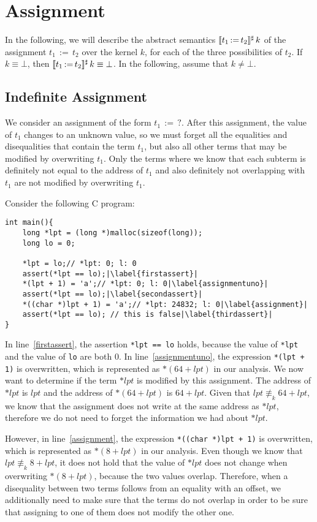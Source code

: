\section{Assignment}

In the following, we will describe the abstract semantics $\llbracket t_1\,{:=}\,t_2\rrbracket^\sharp\,k$ of the assignment $t_1\,{:=}\,t_2$ over the kernel $k$, for each of the three possibilities of $t_2$.
If $k \equiv \bot$, then $\llbracket t_1\,{:=}\,t_2\rrbracket^\sharp\,k \equiv \bot$.
In the following, assume that $k \neq \bot$.

\subsection{Indefinite Assignment}

We consider an assignment of the form $t_1\,{:=}\,?$.
After this assignment, the value of $t_1$ changes to an unknown value,
so we must forget all the equalities and disequalities that contain the term $t_1$,
but also all other terms that may be modified by overwriting $t_1$.
Only the terms where we know that each subterm is definitely not equal to the address of $t_1$ and also definitely not overlapping with $t_1$ are not modified by overwriting $t_1$.

\begin{example}
	Consider the following C program:
\begin{verbatim}
int main(){
	long *lpt = (long *)malloc(sizeof(long));
	long lo = 0;

	*lpt = lo;// *lpt: 0; l: 0
	assert(*lpt == lo);|\label{firstassert}|
	*(lpt + 1) = 'a';// *lpt: 0; l: 0|\label{assignmentuno}|
	assert(*lpt == lo);|\label{secondassert}|
	*((char *)lpt + 1) = 'a';// *lpt: 24832; l: 0|\label{assignment}|
	assert(*lpt == lo); // this is false|\label{thirdassert}|
}
\end{verbatim}
In line~\ref{firstassert}, the assertion \texttt{*lpt == lo} holds, because the value of \texttt{*lpt} and the value of \texttt{lo} are both 0.
In line~\ref{assignmentuno}, the expression \texttt{*(lpt + 1)} is overwritten, which is represented as $*(64 + lpt)$ in our analysis.
We now want to determine if the term $*lpt$ is modified by this assignment.
The address of $*lpt$ is $lpt$ and the address of $*(64 + lpt)$ is $64 + lpt$.
Given that $lpt \nequiv_{k} 64 + lpt$, we know that the assignment does not write at the same address as $*lpt$, therefore we do not need to forget the information we had about $*lpt$.

However, in line~\ref{assignment}, the expression \texttt{*((char *)lpt + 1)} is overwritten, which is represented as $*(8 + lpt)$ in our analysis.
Even though we know that $lpt \nequiv_{k} 8 + lpt$, it does not hold that the value of $*lpt$ does not change when overwriting $*(8 + lpt)$, because the two values overlap.
Therefore, when a disequality between two terms follows from an equality with an offset, we additionally need to make sure that the terms do not overlap in order to be sure that assigning to one of them does not modify the other one.
\end{example}

